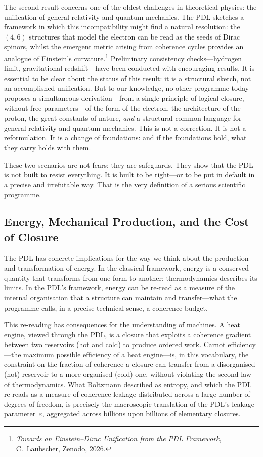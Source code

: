 \documentclass[12pt, a4paper, openright]{book}
\begin{document}
The second result concerns one of the oldest challenges in theoretical physics: the unification of general relativity and quantum mechanics. The PDL sketches a framework in which this incompatibility might find a natural resolution: the $(4,6)$ structures that model the electron can be read as the seeds of Dirac spinors, whilst the emergent metric arising from coherence cycles provides an analogue of Einstein's curvature.\footnote{\textit{Towards an Einstein--Dirac Unification from the PDL Framework}, C.~Laubscher, Zenodo, 2026.} Preliminary consistency checks---hydrogen limit, gravitational redshift---have been conducted with encouraging results. It is essential to be clear about the status of this result: it is a structural sketch, not an accomplished unification. But to our knowledge, no other programme today proposes a simultaneous derivation---from a single principle of logical closure, without free parameters---of the form of the electron, the architecture of the proton, the great constants of nature, \emph{and} a structural common language for general relativity and quantum mechanics. This is not a correction. It is not a reformulation. It is a change of foundations: and if the foundations hold, what they carry holds with them.

\medskip

These two scenarios are not fears: they are safeguards. They show that the PDL is not built to resist everything. It is built to be right---or to be put in default in a precise and irrefutable way. That is the very definition of a serious scientific programme.

\subsection*{Energy, Mechanical Production, and the Cost of Closure}

The PDL has concrete implications for the way we think about the production and transformation of energy. In the classical framework, energy is a conserved quantity that transforms from one form to another; thermodynamics describes its limits. In the PDL's framework, energy can be re-read as a measure of the internal organisation that a structure can maintain and transfer---what the programme calls, in a precise technical sense, a coherence budget.

\medskip

This re-reading has consequences for the understanding of machines. A heat engine, viewed through the PDL, is a closure that exploits a coherence gradient between two reservoirs (hot and cold) to produce ordered work. Carnot efficiency---the maximum possible efficiency of a heat engine---is, in this vocabulary, the constraint on the fraction of coherence a closure can transfer from a disorganised (hot) reservoir to a more organised (cold) one, without violating the second law of thermodynamics. What Boltzmann described as entropy, and which the PDL re-reads as a measure of coherence leakage distributed across a large number of degrees of freedom, is precisely the macroscopic translation of the PDL's leakage parameter~$\varepsilon$, aggregated across billions upon billions of elementary closures.
\end{document}
